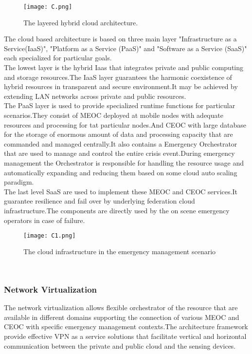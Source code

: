 \documentclass[10pt,a4paper,journal]{IEEEtran}
\begin{document}
\begin{figure}[htbp]
\centering
\texttt{[image: C.png]}
\caption{The layered hybrid cloud architecture.\cite{7}}
\label{1}
\end{figure}
\hspace{2em}The cloud based architecture is based on three main layer "Infrastructure as a Service(IaaS)", "Platform as a Service (PaaS)" and "Software as a Service (SaaS)" each specialized for particular goals.\\
\hspace{2em}The lowest layer is the hybrid Iaas that integrates private and public computing and storage resources.The IaaS layer guarantees the harmonic coexistence of hybrid resources in transparent and secure environment.It may be achieved by extending LAN  networks across private and public resources.\\
\hspace{2em}The PaaS layer is used to provide specialized runtime functions for particular scenarios.They consist of MEOC deployed at mobile nodes with adequate resources and processing for tat particular nodes.And CEOC with large database for the storage of enormous amount of data and processing capacity that are commanded and managed centrally.It also contains a Emergency Orchestrator that are used to manage and control the entire crisis event.During emergency management the Orchestrator is responsible for handling the resource  usage and automatically expanding and reducing them based on some cloud auto scaling paradigm.\\
\hspace{2em}The last level SaaS are used to implement these MEOC and CEOC services.It guarantee resilience and fail over by underlying federation cloud infrastructure.The components are directly used by the on scene emergency operators in case of failure.\\

\begin{figure}[htbp]
\centering
\texttt{[image: C1.png]}
\caption{The cloud infrastructure in the emergency management scenario\cite{7}}
\label{2}
\end{figure}
\\
\subsubsection{Network Virtualization}
The network virtualization allows flexible orchestrator of the resource that are available in different domains supporting the connection of various MEOC and CEOC with specific emergency management contexts.The architecture framework provide effective VPN as a service solutions that facilitate vertical and horizontal communication between the private and public cloud and the sensing devices.\\
\end{document}
